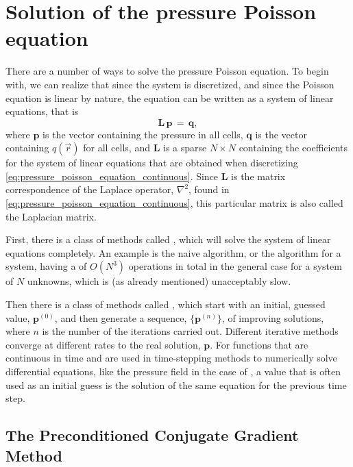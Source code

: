 \section{Solution of the pressure Poisson equation}

\label{sec:pressure_poisson_equation_solution}

There are a number of ways to solve the pressure Poisson equation. To begin with, we can realize that since the system is discretized, and since the Poisson equation is linear by nature, the equation can be written as a system of linear equations, that is
%
\begin{equation} \label{eq:pressure_poisson_equation_matrix}
\mathbf{L\,p} \,=\, \mathbf{q},
\end{equation}
%
where $\mathbf{p}$ is the vector containing the pressure in all cells, $\mathbf{q}$ is the vector containing $q(\vec{r})$ for all cells, and $\mathbf{L}$ is a sparse $N\times N$  containing the coefficients for the system of linear equations that are obtained when discretizing \eqref{eq:pressure_poisson_equation_continuous}. Since $\mathbf{L}$ is the matrix correspondence of the Laplace operator, $\nabla^2$, found in \eqref{eq:pressure_poisson_equation_continuous}, this particular matrix is also called the Laplacian matrix.

First, there is a class of methods called , which will solve the system of linear equations completely. An example is the naive  algorithm, or the  algorithm for a  system, having a  of $O(N^3)$ operations in total in the general case for a system of $N$ unknowns, which is (as already mentioned) unacceptably slow.

Then there is a class of methods called , which start with an initial, guessed value, $\mathbf{p}^{(0)}$, and then generate a sequence, $\{\mathbf{p}^{(n)}\}$, of improving \approximate solutions, where $n$ is the number of the iterations carried out. Different iterative methods converge at different rates to the real solution, $\mathbf{p}$. For functions that are continuous in time and are used in time-stepping methods to numerically solve differential equations, like the pressure field in the case of \CFD, a value that is often used as an initial guess is the solution of the same equation for the previous time step.

\subsection{The Preconditioned Conjugate Gradient Method}

